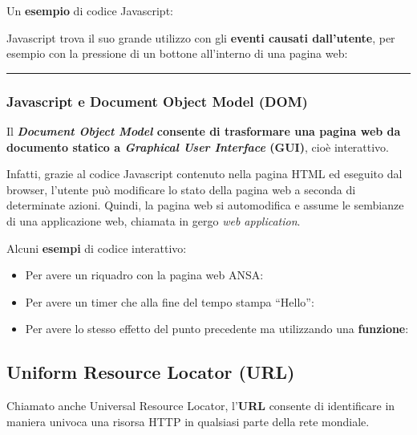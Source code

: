 \documentclass[a4paper]{article}
\newcommand{\longline}{\noindent\rule{\textwidth}{0.4pt}}
\newcommand{\dquotes}[1]{``#1''}
\begin{document}
	\noindent
	Un \textcolor{Green4}{\textbf{esempio}} di codice Javascript:
	\newpage
	
	\noindent
	Javascript trova il suo grande utilizzo con gli \textbf{eventi causati dall'utente}, per esempio con la pressione di un bottone all'interno di una pagina web:
	
	
	\longline
	
	\subsubsection{Javascript e Document Object Model (DOM)}
	
	Il \textbf{\emph{Document Object Model} consente di trasformare una pagina web da documento statico a \emph{Graphical User Interface} (GUI)}, cioè interattivo.
	
	Infatti, grazie al codice Javascript contenuto nella pagina HTML ed eseguito dal browser, l'utente può modificare lo stato della pagina web a seconda di determinate azioni. Quindi, la pagina web si automodifica e assume le sembianze di una applicazione web, chiamata in gergo \emph{web application}.\newline
	
	\noindent
	Alcuni \textcolor{Green4}{\textbf{esempi}} di codice interattivo:
	\begin{itemize}
		\item Per avere un riquadro con la pagina web ANSA:
		\newpage
		
		\item Per avere un timer che alla fine del tempo stampa \dquotes{Hello}:
		
		
		\item Per avere lo stesso effetto del punto precedente ma utilizzando una \textbf{funzione}:
		
	\end{itemize}\newpage
	
	\subsection{Uniform Resource Locator (URL)}
	
	Chiamato anche Universal Resource Locator, l'\textcolor{Red3}{\textbf{URL}} consente di identificare in maniera univoca una risorsa HTTP in qualsiasi parte della rete mondiale.\newline
	
\end{document}

